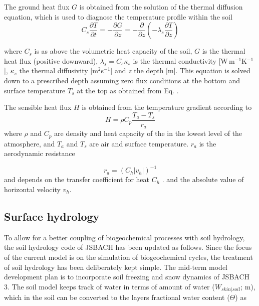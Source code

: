 The ground heat flux $G$ is obtained from the solution of the thermal diffusion equation, which is used to diagnose the temperature profile within the soil 
\begin{equation}
C_s\frac{\partial T}{\partial t}=-\frac{\partial G}{\partial z}=-\frac{\partial}{\partial z}\left(-\lambda_s\frac{\partial T}{\partial z}\right)
\end{equation}

where $C_s$ is as above the volumetric heat capacity of the soil, $G$ is the thermal heat flux (positive downward), $\lambda_s=C_s \kappa_s$ is the thermal conductivity [W\,m$^{-1}$K$^{-1}$], $\kappa_s$ the thermal diffusivity [m$^2$s$^{-1}$] and $z$ the depth [m]. This equation is solved down to a prescribed depth assuming zero flux conditions at the bottom and surface temperature $T_s$ at the top as obtained from Eq. \label{eq:sse_surface_energy_balance}. 

The sensible heat flux $H$ is obtained from the temperature gradient according to
\begin{equation}
H=\rho C_p\frac{T_a-T_s}{r_a}\label{eq:sensibleHeatFlux}
\end{equation}
where $\rho$ and $C_p$ are density and heat capacity of the in the lowest level of the atmosphere, and $T_a$ and $T_s$ are air and surface temperature. $r_a$ is the aerodynamic resistance 

\begin{equation}
r_{a}=(C_{h}\left|v_{h}\right|)^{-1}\label{eq:aerodynResistance}
\end{equation}
and depends on the transfer coefficient for heat $C_{h}$ \cite{Roeckner:2003wc}. and the absolute value of horizontal velocity $v_{h}$.

\subsection{Surface hydrology}\label{sec:sse_surface_hydrology}

To allow for a better coupling of biogeochemical processes with soil hydrology, the soil hydrology code of JSBACH has been updated as follows. Since the focus of the current model is on the simulation of biogeochemical cycles, the treatment of soil hydrology has been deliberately kept simple. The mid-term model development plan is to incorporate soil freezing and snow dynamics of JSBACH 3. The soil model keeps track of water in terms of amount of water ($W_{skin|soil}$; m), which in the soil can be converted to the layers fractional water content ($\Theta$) as 

